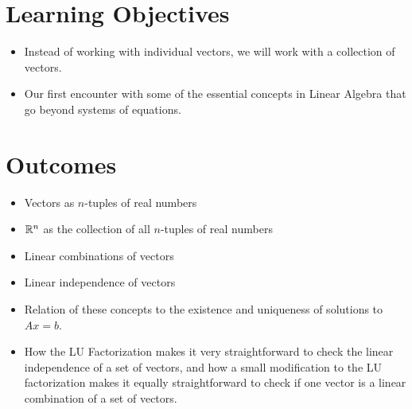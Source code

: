\section*{Learning Objectives}
\begin{itemize}
\item Instead of working with individual vectors, we will work with a collection of vectors. 
\item Our first encounter with some of the essential concepts in Linear Algebra that go beyond systems of equations.
\end{itemize}

\section*{Outcomes}
\begin{itemize}
\item Vectors as $n$-tuples of real numbers
\item $\mathbb R^n$ as the collection of all $n$-tuples of real numbers
\item Linear combinations of vectors
\item Linear independence of vectors
\item Relation of these concepts to the existence and uniqueness of solutions to $Ax=b$.
\item How the LU Factorization makes it very straightforward to check the linear independence of a set of vectors, and how a small modification to the LU factorization makes it equally straightforward to check if one vector is a linear combination of a set of vectors. 
\end{itemize}

\vspace*{1cm}

